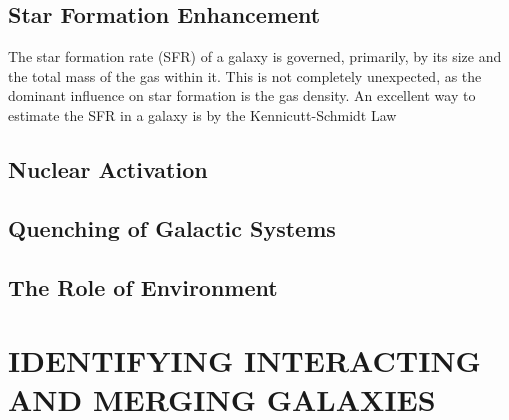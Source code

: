 \subsection{Star Formation Enhancement} 
\noindent The star formation rate (SFR) of a galaxy is governed, primarily, by its size and the total mass of the gas within it. This is not completely unexpected, as the dominant influence on star formation is the gas density. An excellent way to estimate the SFR in a galaxy is by the Kennicutt-Schmidt Law \citep{Kennicutt-Schmidt Law Paper}

\subsection{Nuclear Activation}
\subsection{Quenching of Galactic Systems}
\subsection{The Role of Environment}

\section{IDENTIFYING INTERACTING AND MERGING GALAXIES}